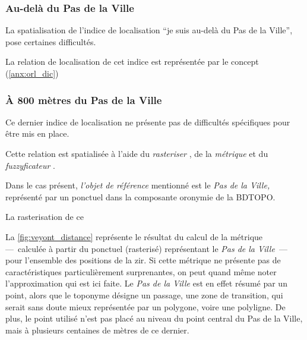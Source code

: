 %   



\subsubsection{Au-delà du Pas de la Ville}

La spatialisation de l'indice de localisation \enquote{je suis au-delà
  du Pas de la Ville}, pose certaines difficultés.

La relation de localisation de cet indice est représentée par le
concept 
(\autoref{anx:orl_dic})

\subsubsection{À 800 mètres du Pas de la Ville}

Ce dernier indice de localisation ne présente pas de difficultés
spécifiques pour être mis en place.


Cette relation est spatialisée à l'aide du \emph{rasteriser}
, de la \emph{métrique}
 et du \emph{fuzzyficateur}
.

Dans le cas présent, \emph{l'objet de référence} mentionné est le
\emph{Pas de la Ville,} représenté par un ponctuel dans la composante
oronymie de la BDTOPO.


La rasterisation de ce



La \autoref{fig:veyont_distance} représente le résultat du calcul de
la métrique  ---~calculée à partir du ponctuel
(rasterisé) représentant le \emph{Pas de la Ville}~--- pour l'ensemble
des positions de la \ac{zir}. Si cette métrique ne présente pas de
caractéristiques particulièrement surprenantes, on peut quand même
noter l'approximation qui est ici faite. Le \emph{Pas de la Ville} est
en effet résumé par un point, alors que le toponyme désigne un
passage, une zone de transition, qui serait sans doute mieux
représentée par un polygone, voire une polyligne. De plus, le point
utilisé n'est pas placé au niveau du point central du Pas de la Ville,
mais à plusieurs centaines de mètres de ce dernier.


